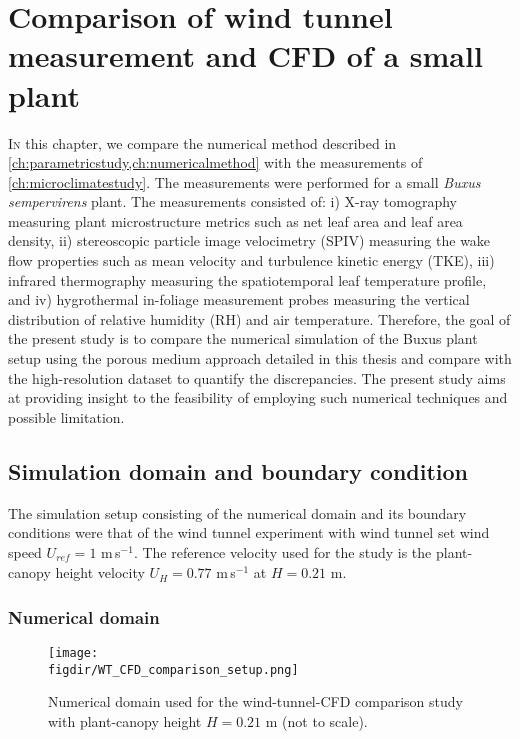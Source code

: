 \chapter{Comparison of wind tunnel measurement and CFD of a small plant}
\label{ch:wtcfdcomparison}
\def\figdir{chapters/ch06_wtcfdcomparison/figures}	


\lettrine[lines=3,nindent=0em,loversize=0.1]{I}{n} this chapter, we compare the numerical method described in \cref{ch:parametricstudy,ch:numericalmethod} with the measurements of \cref{ch:microclimatestudy}. The measurements were performed for a small \textit{Buxus} \textit{sempervirens} plant. The measurements consisted of: i) X-ray tomography measuring plant microstructure metrics such as net leaf area and leaf area density, ii) stereoscopic particle image velocimetry (SPIV) measuring the wake flow properties such as mean velocity and turbulence kinetic energy (TKE), iii) infrared thermography measuring the spatiotemporal leaf temperature profile, and iv) hygrothermal in-foliage measurement probes measuring the vertical distribution of relative humidity (RH) and air temperature. Therefore, the goal of the present study is to compare the numerical simulation of the Buxus plant setup using the porous medium approach detailed in this thesis and compare with the high-resolution dataset to quantify the discrepancies. The present study aims at providing insight to the feasibility of employing such numerical techniques and possible limitation.

\section{Simulation domain and boundary condition}

The simulation setup consisting of the numerical domain and its boundary conditions were that of the wind tunnel experiment with wind tunnel set wind speed $U_{\textit{ref}} = 1$ m\,s$^{-1}$. The reference velocity used for the study is the plant-canopy height velocity $U_H = 0.77$ m\,s$^{-1}$ at $H = 0.21$ m.

\subsection{Numerical domain}
	
	\begin{figure}[t]
		\centering
		\texttt{[image: \\figdir/WT\_CFD\_comparison\_setup.png]}
		\caption{Numerical domain used for the wind-tunnel-CFD comparison study with plant-canopy height $H = 0.21$ m (not to scale).}
		\label{fig:WT_CFD_comparison_setup}
	\end{figure}

